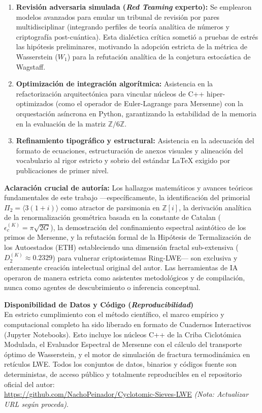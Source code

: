 \documentclass{article}
\numberwithin{equation}{section}
\theoremstyle{plain}
\theoremstyle{definition}
\begin{document}
\begin{enumerate}
    \item \textbf{Revisión adversaria simulada (\textit{Red Teaming} experto):} Se emplearon modelos avanzados para emular un tribunal de revisión por pares multidisciplinar (integrando perfiles de teoría analítica de números y criptografía post-cuántica). Esta dialéctica crítica sometió a pruebas de estrés las hipótesis preliminares, motivando la adopción estricta de la métrica de Wasserstein ($W_1$) para la refutación analítica de la conjetura estocástica de Wagstaff.
    \item \textbf{Optimización de integración algorítmica:} Asistencia en la refactorización arquitectónica para vincular núcleos de C++ hiper-optimizados (como el operador de Euler-Lagrange para Mersenne) con la orquestación asíncrona en Python, garantizando la estabilidad de la memoria en la evaluación de la matriz $\mathbb{Z}/6\mathbb{Z}$.
    \item \textbf{Refinamiento tipográfico y estructural:} Asistencia en la adecuación del formato de ecuaciones, estructuración de anexos visuales y alineación del vocabulario al rigor estricto y sobrio del estándar LaTeX exigido por publicaciones de primer nivel.
\end{enumerate}

\textbf{Aclaración crucial de autoría:} Los hallazgos matemáticos y avances teóricos fundamentales de este trabajo —específicamente, la identificación del primorial $\Pi_2 = \langle 3(1+i) \rangle$ como atractor de parsimonia en $\mathbb{Z}[i]$, la derivación analítica de la renormalización geométrica basada en la constante de Catalan ($\epsilon_c^{(K)} = \pi\sqrt{2G}$), la demostración del confinamiento espectral asintótico de los primos de Mersenne, y la refutación formal de la Hipótesis de Termalización de los Autoestados (ETH) estableciendo una dimensión fractal sub-extensiva ($D_2^{(K)} \approx 0.2329$) para vulnerar criptosistemas Ring-LWE— son exclusiva y enteramente creación intelectual original del autor. Las herramientas de IA operaron de manera estricta como asistentes metodológicos y de compilación, nunca como agentes de descubrimiento o inferencia conceptual.

\vspace{0.3cm}
\noindent \textbf{Disponibilidad de Datos y Código (\textit{Reproducibilidad})} \\
En estricto cumplimiento con el método científico, el marco empírico y computacional completo ha sido liberado en formato de Cuadernos Interactivos (Jupyter Notebooks). Esto incluye los núcleos C++ de la Criba Ciclotómica Modulada, el Evaluador Espectral de Mersenne con el cálculo del transporte óptimo de Wasserstein, y el motor de simulación de fractura termodinámica en retículos LWE. Todos los conjuntos de datos, binarios y códigos fuente son deterministas, de acceso público y totalmente reproducibles en el repositorio oficial del autor: \\
\url{https://github.com/NachoPeinador/Cyclotomic-Sieves-LWE} \textit{(Nota: Actualizar URL según proceda)}.
\end{document}
